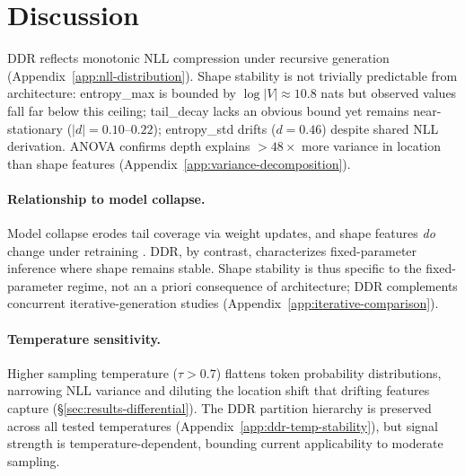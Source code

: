 \section{Discussion}
\label{sec:discussion}

 DDR reflects monotonic NLL compression under recursive generation (Appendix~\ref{app:nll-distribution}).
Shape stability is not trivially predictable from architecture: entropy\_max is bounded by $\log|V|{\approx}10.8$ nats but observed values fall far below this ceiling; tail\_decay lacks an obvious bound yet remains near-stationary ($|d|{=}0.10$--$0.22$); entropy\_std drifts ($d{=}0.46$) despite shared NLL derivation.
ANOVA confirms depth explains ${>}48{\times}$ more variance in location than shape features (Appendix~\ref{app:variance-decomposition}).

\paragraph{Relationship to model collapse.}
 Model collapse erodes tail coverage via weight updates, and shape features \emph{do} change under retraining \cite{curse_of_recursion,strong_model_collapse}. DDR, by contrast, characterizes fixed-parameter inference where shape remains stable.
Shape stability is thus specific to the fixed-parameter regime, not an a priori consequence of architecture; DDR complements concurrent iterative-generation studies (Appendix~\ref{app:iterative-comparison}).

\paragraph{Temperature sensitivity.}
 Higher sampling temperature ($\tau > 0.7$) flattens token probability distributions, narrowing NLL variance and diluting the location shift that drifting features capture (\S\ref{sec:results-differential}).
The DDR partition hierarchy is preserved across all tested temperatures (Appendix~\ref{app:ddr-temp-stability}), but signal strength is temperature-dependent, bounding current applicability to moderate sampling.

